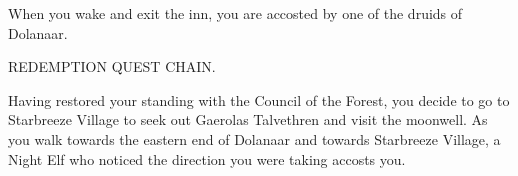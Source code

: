
When you wake and exit the inn, you are accosted by one of the druids of Dolanaar.


REDEMPTION QUEST CHAIN.

Having restored your standing with the Council of the Forest, you decide to go to Starbreeze Village to seek out Gaerolas Talvethren and visit the moonwell. As you walk towards the eastern end of Dolanaar and towards Starbreeze Village, a Night Elf who noticed the direction you were taking accosts you.
